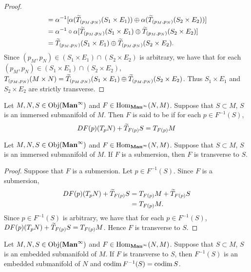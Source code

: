 \documentclass{book}
\begin{document}
\begin{proof}
\begin{align*}
			& = \alpha^{-1}[\alpha (\widetilde{T}_{(p_M, p_N)} (S_1 \times E_1)) \oplus \alpha (\widetilde{T}_{(p_M, p_N)} (S_2 \times E_2))] \\
			& = \alpha^{-1} \circ \alpha [\widetilde{T}_{(p_M, p_N)} (S_1 \times E_1) \oplus  \widetilde{T}_{(p_M, p_N)} (S_2 \times E_2)] \\
			& = \widetilde{T}_{(p_M, p_N)} (S_1 \times E_1) \oplus  \widetilde{T}_{(p_M, p_N)} (S_2 \times E_2).
		\end{align*}
		Since $(p_M, p_N) \in (S_1 \times E_1) \cap (S_2 \times E_2) $ is arbitrary, we have that for each $(p_M, p_N) \in (S_1 \times E_1) \cap (S_2 \times E_2)$, $T_{(p_M, p_N)}(M \times N) = \widetilde{T}_{(p_M, p_N)} (S_1 \times E_1) \oplus  \widetilde{T}_{(p_M, p_N)} (S_2 \times E_2)$. Thus $S_1 \times E_1$ and $S_2 \times E_2$ are strictly transverse.
	\end{proof}

	\begin{defn} 
		Let $M, N, S \in \operatorname{Obj}(\operatorname*{\text{\textbf{Man}}^{\infty}})$ and $F \in \operatorname{Hom}_{\operatorname*{\text{\textbf{Man}}^{\infty}}}(N, M)$. Suppose that $S \subset M$, $S$ is an immersed submanifold of $M$. Then $F$ is said to be  if for each $p \in F^{-1}(S)$, 
		$$DF(p)(T_pN) + \widetilde{T}_{F(p)}S = T_{F(p)}M$$
	\end{defn}

	\begin{ex} 
		Let $M, N, S \in \operatorname{Obj}(\operatorname*{\text{\textbf{Man}}^{\infty}})$ and $F \in \operatorname{Hom}_{\operatorname*{\text{\textbf{Man}}^{\infty}}}(N, M)$. Suppose that $S \subset M$, $S$ is an immersed submanifold of $M$. If $F$ is a submersion, then $F$ is transverse to $S$.  
	\end{ex}

	\begin{proof}
		Suppose that $F$ is a submersion. Let $p \in F^{-1}(S)$. Since $F$ is a submersion, 
		\begin{align*}
			DF(p)(T_pN) + \widetilde{T}_{F(p)}S
			& = T_{F(p)}M + \widetilde{T}_{F(p)}S \\
			& = T_{F(p)}M. 
		\end{align*} 
		Since $p \in F^{-1}(S)$ is arbitrary, we have that for each $p \in F^{-1}(S)$, $DF(p)(T_pN) + \widetilde{T}_{F(p)}S = T_{F(p)}M$. Hence $F$ is transverse to $S$.
	\end{proof}

	\begin{ex} 
		Let $M, N, S \in \operatorname{Obj}(\operatorname*{\text{\textbf{Man}}^{\infty}})$ and $F \in \operatorname{Hom}_{\operatorname*{\text{\textbf{Man}}^{\infty}}}(N, M)$. Suppose that $S \subset M$, $S$ is an embedded submanifold of $M$. If $F$ is transverse to $S$, then $F^{-1}(S)$ is an embedded submanifold of $N$ and $\operatorname{codim} F^{-1}(S) = \operatorname{codim} S$. 
	\end{ex}
\end{document}
